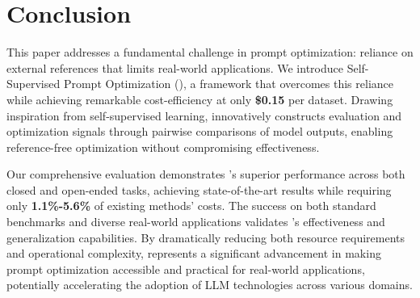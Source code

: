 \section{Conclusion}



This paper addresses a fundamental challenge in prompt optimization: reliance on external references that limits real-world applications. We introduce Self-Supervised Prompt Optimization (\ours), a framework that overcomes this reliance while achieving remarkable cost-efficiency at only \textbf{\$0.15} per dataset. Drawing inspiration from self-supervised learning, \ours innovatively constructs evaluation and optimization signals through pairwise comparisons of model outputs, enabling reference-free optimization without compromising effectiveness. 

Our comprehensive evaluation demonstrates \ours's superior performance across both closed and open-ended tasks, achieving state-of-the-art results while requiring only \textbf{1.1\%-5.6\%} of existing methods' costs. The success on both standard benchmarks and diverse real-world applications validates \ours's effectiveness and generalization capabilities. By dramatically reducing both resource requirements and operational complexity, \ours represents a significant advancement in making prompt optimization accessible and practical for real-world applications, potentially accelerating the adoption of LLM technologies across various domains.
